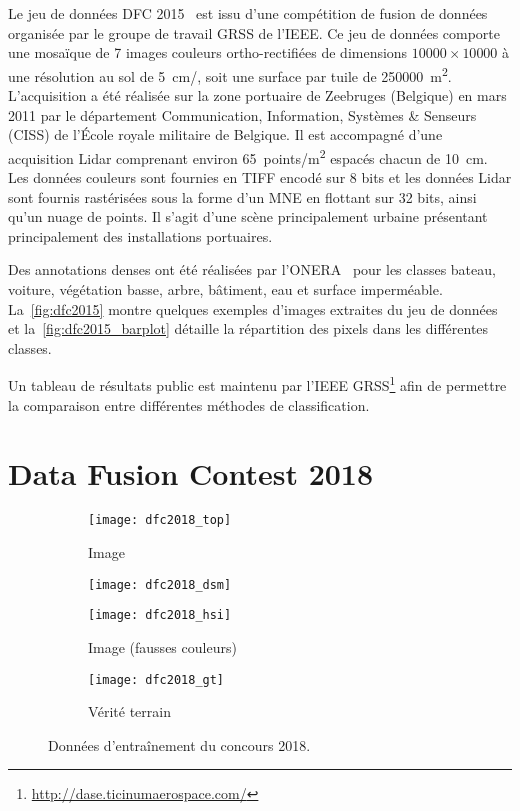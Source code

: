 Le jeu de données \gls{DFC} 2015~\cite{campos-taberner_processing_2016} est issu d'une compétition de fusion de données organisée par le groupe de travail \gls{GRSS} de l'\gls{IEEE}. Ce jeu de données comporte une mosaïque de 7 images couleurs ortho-rectifiées de dimensions $10 000\times10 000$ à une résolution au sol de \SI{5}{\centi\meter/\px}, soit une surface par tuile de \SI{250 000}{\meter\squared}. L'acquisition a été réalisée sur la zone portuaire de Zeebruges (Belgique) en mars 2011 par le département Communication, Information, Systèmes \& Senseurs (CISS) de l'École royale militaire de Belgique. Il est accompagné d'une acquisition \gls{Lidar} comprenant environ \SI{65}{points/\meter\squared} espacés chacun de \SI{10}{\centi\meter}. Les données couleurs sont fournies en \gls{TIFF} encodé sur 8 bits et les données \gls{Lidar} sont fournis rastérisées sous la forme d'un \gls{MNE} en flottant sur 32 bits, ainsi qu'un nuage de points. Il s'agit d'une scène principalement urbaine présentant principalement des installations portuaires.

 Des annotations denses ont été réalisées par l'\gls{ONERA}~\cite{lagrange_benchmarking_2015} pour les classes bateau, voiture, végétation basse, arbre, bâtiment, eau et surface imperméable. La~\cref{fig:dfc2015} montre quelques exemples d'images extraites du jeu de données et la~\cref{fig:dfc2015_barplot} détaille la répartition des pixels dans les différentes classes.

Un tableau de résultats public est maintenu par l'\gls{IEEE} \gls{GRSS}\footnote{\url{http://dase.ticinumaerospace.com/}} afin de permettre la comparaison entre différentes méthodes de classification.

\section{Data Fusion Contest 2018}
\label{annexe:dfc2018}

\begin{figure}[h]
  \begin{subfigure}{\textwidth}
    \texttt{[image: dfc2018\_top]}
    \caption{Image }
  \end{subfigure}
  \begin{subfigure}{\textwidth}
    \texttt{[image: dfc2018\_dsm]}
    \caption{}
  \end{subfigure}
  \begin{subfigure}{\textwidth}
    \texttt{[image: dfc2018\_hsi]}
    \caption{Image  (fausses couleurs)}
  \end{subfigure}
  \begin{subfigure}{\textwidth}
    \texttt{[image: dfc2018\_gt]}
    \caption{Vérité terrain}
  \end{subfigure}
  \caption{Données d'entraînement du concours  2018.}
  \label{fig:dfc2018}
\end{figure}

